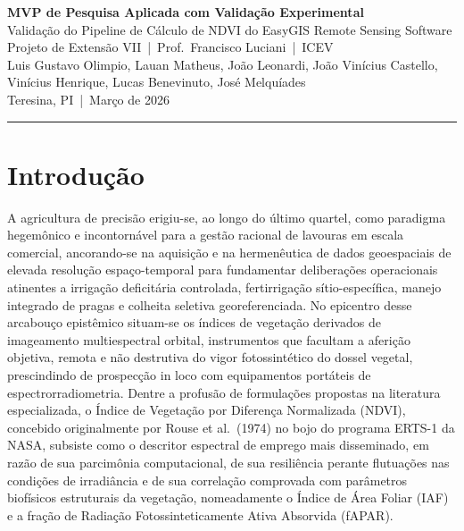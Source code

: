 \documentclass[10pt, a4paper]{article}
\begin{document}
\begin{center}
  {\large\bfseries MVP de Pesquisa Aplicada com Validação Experimental}\\[4pt]
  {\normalsize Validação do Pipeline de Cálculo de NDVI do EasyGIS Remote Sensing Software}\\[8pt]
  {\small Projeto de Extensão VII \,|\, Prof.\ Francisco Luciani \,|\, ICEV}\\[4pt]
  {\small Luis Gustavo Olimpio, Lauan Matheus, João Leonardi, João Vinícius Castello,\\
  Vinícius Henrique, Lucas Benevinuto, José Melquíades}\\[3pt]
  {\footnotesize Teresina, PI \,|\, Março de 2026}
\end{center}
\vspace{4pt}\hrule\vspace{8pt}

\section{Introdução}

A agricultura de precisão erigiu-se, ao longo do último quartel, como paradigma hegemônico e incontornável para a gestão racional de lavouras em escala comercial, ancorando-se na aquisição e na hermenêutica de dados geoespaciais de elevada resolução espaço-temporal para fundamentar deliberações operacionais atinentes a irrigação deficitária controlada, fertirrigação sítio-específica, manejo integrado de pragas e colheita seletiva georeferenciada. No epicentro desse arcabouço epistêmico situam-se os índices de vegetação derivados de imageamento multiespectral orbital, instrumentos que facultam a aferição objetiva, remota e não destrutiva do vigor fotossintético do dossel vegetal, prescindindo de prospecção in loco com equipamentos portáteis de espectrorradiometria. Dentre a profusão de formulações propostas na literatura especializada, o Índice de Vegetação por Diferença Normalizada (NDVI), concebido originalmente por Rouse et al.\ (1974) no bojo do programa ERTS-1 da NASA, subsiste como o descritor espectral de emprego mais disseminado, em razão de sua parcimônia computacional, de sua resiliência perante flutuações nas condições de irradiância e de sua correlação comprovada com parâmetros biofísicos estruturais da vegetação, nomeadamente o Índice de Área Foliar (IAF) e a fração de Radiação Fotossinteticamente Ativa Absorvida (fAPAR).
\end{document}
